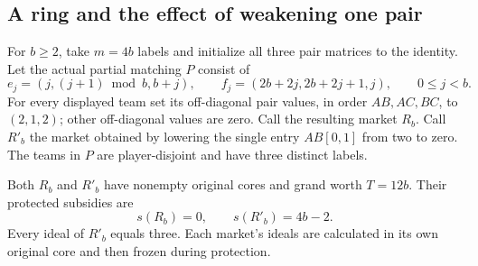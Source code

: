 \subsection{A ring and the effect of weakening one pair}
For $b\ge2$, take $m=4b$ labels and initialize all three pair matrices
to the identity. Let the actual partial matching $P$ consist of
\[
 e_j=(j,(j+1)\bmod b,b+j),\qquad
 f_j=(2b+2j,2b+2j+1,j),\qquad 0\le j<b.
\]
For every displayed team set its off-diagonal pair values, in order
$AB,AC,BC$, to $(2,1,2)$; other off-diagonal values are zero.
Call the resulting market $R_b$. Call $R'_b$ the market obtained by
lowering the single entry $AB[0,1]$ from two to zero. The teams in $P$
are player-disjoint and have three distinct labels.

\begin{theorem}\label{anc:ring}
Both $R_b$ and $R'_b$ have nonempty original cores and grand worth
$T=12b$. Their protected subsidies are
\[
                          s(R_b)=0,\qquad s(R'_b)=4b-2.
\]
Every ideal of $R'_b$ equals three. Each market's ideals are calculated
in its own original core and then frozen during protection.
\end{theorem}
